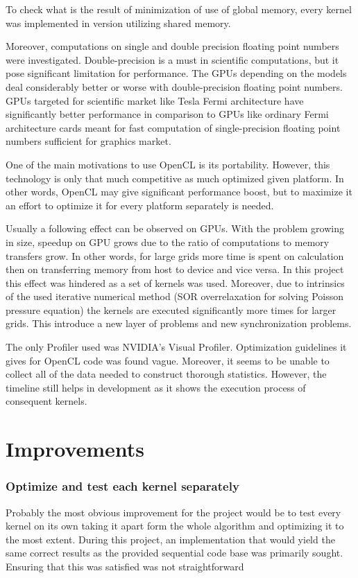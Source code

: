 To check what is the result of minimization of use of global memory, every kernel was implemented in version utilizing shared memory.

Moreover, computations on single and double precision floating point numbers were investigated. Double-precision is a must in scientific computations, but it pose significant limitation for performance. The GPUs depending on the models deal considerably better or worse with double-precision floating point numbers. GPUs targeted for scientific market like Tesla Fermi architecture have significantly better performance in comparison to GPUs like ordinary Fermi architecture cards meant for fast computation of single-precision floating point numbers sufficient for graphics market. 

One of the main motivations to use OpenCL is its portability. However, this technology is only that much competitive as much optimized given platform. In other words, OpenCL may give significant performance boost, but to maximize it an effort to optimize it for every platform separately is needed.

Usually a following effect can be observed on GPUs. With the problem growing in size, speedup on GPU grows due to the ratio of computations to memory transfers grow. In other words, for large grids more time is spent on calculation then on transferring memory from host to device and vice versa. In this project this effect was hindered as a set of kernels was used. Moreover, due to intrinsics of the used iterative numerical method (SOR overrelaxation for solving Poisson pressure equation) the kernels are executed significantly more times for larger grids.  This introduce a new layer of problems and new synchronization problems.

The only Profiler used was NVIDIA's Visual Profiler. Optimization guidelines it gives for OpenCL code was found vague. Moreover, it seems to be unable to collect all of the data needed to construct thorough statistics. However, the timeline still helps in development as it shows the execution process of consequent kernels.

\section{Improvements}
\subsubsection{Optimize and test each kernel separately}
Probably the most obvious improvement for the project would be to test every kernel on its own taking it apart form the whole algorithm and optimizing it to the most extent. During this project, an implementation that would yield the same correct results as the provided sequential code base was primarily sought. Ensuring that this was satisfied was not straightforward

